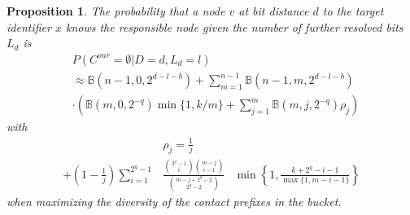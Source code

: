 \documentclass[10pt, conference, compsocconf, letterpaper]{IEEEtran}
\newcommand{\found}{\emptyset}
\renewcommand{\binom}{\mathbb{B}}
\newtheorem{proposition}{Proposition}
\begin{document}
\vspace{3pt}
\begin{proposition} \label{prop:s2}
The probability that a node $v$ at bit distance $d$ to the target identifier $x$ knows the responsible
node given the number of further resolved bits $L_d$ is
\begin{align}
\label{eq:Fown}
&P(C^{our} = \found | D = d,L_d=l) \nonumber \\
&\approx \binom(n-1,0,2^{d-l-b}) +\sum_{m=1}^{n-1} \binom(n-1,m,2^{d-l-b}) \\
&\cdot \left(\binom(m,0,2^{-q})\min\{1, k/m\} 
+ \sum_{j=1}^{m}  \binom(m,j,2^{-q}) \rho_j \right)\nonumber 
\end{align} 
with
\begin{align*}
& \rho_j = \frac{1}{j} \\
 + 
(1-\frac{1}{j})\sum_{i=1}^{2^{q}-1} &
\frac{{2^q-1 \choose i}{m-j \choose i-1}}{{m-j+2^q-2 \choose 2^q-2}} 
& \min\left\lbrace 1,\frac{k+2^{q}-i-1}{\max\{1,m-i-1\} }\right\rbrace
\end{align*}
when maximizing the diversity of the contact prefixes in the bucket.
\end{proposition}
\end{document}
